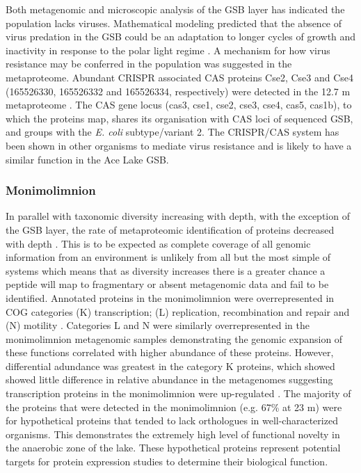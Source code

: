 Both metagenomic and microscopic analysis of the \ac{GSB} layer has indicated the population lacks viruses.
Mathematical modeling predicted that the absence of virus predation in the \ac{GSB} could be an adaptation to longer cycles of growth and inactivity in response to the polar light regime \cite{Lauro2011}. 
A mechanism for how virus resistance may be conferred in the population was suggested in the metaproteome.
Abundant \ac{CRISPR} associated \ac{CAS} proteins Cse2, Cse3 and Cse4 (165526330, 165526332 and 165526334, respectively) were detected in the 12.7 m metaproteome . 
The \ac{CAS} gene locus (cas3, cse1, cse2, cse3, cse4, cas5, cas1b), to which the proteins map, shares its organisation with \ac{CAS} loci of sequenced \ac{GSB}, and groups with the \emph{E. coli} subtype/variant 2. 
The \ac{CRISPR}/\ac{CAS} system has been shown in other organisms to mediate virus resistance \cite{Karginov2010, Horvath2010} and is likely to have a similar function in the Ace Lake \ac{GSB}.


\subsubsection{Monimolimnion}
In parallel with taxonomic diversity increasing with depth, with the exception of the \ac{GSB} layer, the rate of metaproteomic identification of proteins decreased with depth .
This is to be expected as complete coverage of all genomic information from an environment is unlikely from all but the most simple of systems which means that as diversity increases there is a greater chance a peptide will map to fragmentary or absent metagenomic data and fail to be identified.
Annotated proteins in the monimolimnion were overrepresented in \ac{COG} categories (K) transcription; (L) replication, recombination and repair and (N) motility . 
Categories L and N were similarly overrepresented in the monimolimnion metagenomic samples \cite{Lauro2011} demonstrating the genomic expansion of these functions correlated with higher abundance of these proteins.
However, differential adundance was greatest in the category K proteins, which showed showed little difference in relative abundance in the metagenomes \cite{Lauro2011} suggesting transcription proteins in the monimolimnion were up-regulated . 
The majority of the proteins that were detected in the monimolimnion (e.g. 67\% at 23 m)  were for hypothetical proteins that tended to lack orthologues in well-characterized organisms.
This demonstrates the extremely high level of functional novelty in the anaerobic zone of the lake.
These hypothetical proteins represent potential targets for protein expression studies to determine their biological function.


